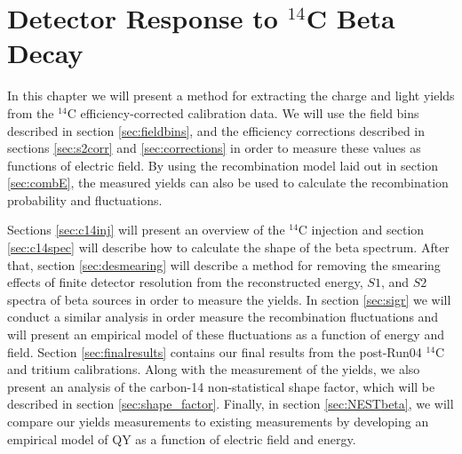 \chapter{Detector Response to $^{14}$C Beta Decay}\label{chap:5}
In this chapter we will present a method for extracting the charge and light yields from the $^{14}$C efficiency-corrected calibration data. We will use the field bins described in section \ref{sec:fieldbins}, and the efficiency corrections described in sections \ref{sec:s2corr} and \ref{sec:corrections} in order to measure these values as functions of electric field. By using the recombination model laid out in section \ref{sec:combE}, the measured yields can also be used to calculate the recombination probability and fluctuations. 

Sections \ref{sec:c14inj} will present an overview of the $^{14}$C injection and section \ref{sec:c14spec} will describe how to calculate the shape of the beta spectrum. After that, section \ref{sec:desmearing} will describe a method for removing the smearing effects of finite detector resolution from the reconstructed energy, $S1$, and $S2$ spectra of beta sources in order to measure the yields. In section \ref{sec:sigr} we will conduct a similar analysis in order measure the recombination fluctuations and will present an empirical model of these fluctuations as a function of energy and field. Section \ref{sec:finalresults} contains our final results from the post-Run04 $^{14}$C and tritium calibrations. Along with the measurement of the yields, we also present an analysis of the carbon-14 non-statistical shape factor, which will be described in section \ref{sec:shape_factor}. Finally, in section \ref{sec:NESTbeta}, we will compare our yields measurements to existing measurements by developing an empirical model of QY as a function of electric field and energy.

